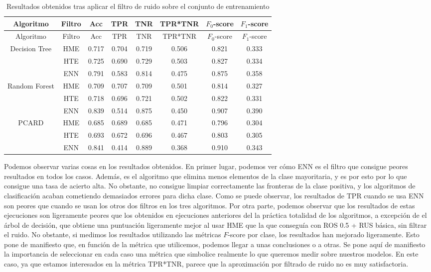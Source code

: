 \documentclass[
  a4paper,
,tablecaptionabove
]{scrartcl}
\begin{document}
\begin{longtable}[]{@{}cccccccc@{}}
\caption{Resultados obtenidos tras aplicar el filtro de ruido sobre el
conjunto de entrenamiento}\tabularnewline
\toprule
Algoritmo & Filtro & Acc & TPR & TNR & TPR*TNR & \(F_0\)-score &
\(F_1\)-score\tabularnewline
\midrule
\endfirsthead
\toprule
Algoritmo & Filtro & Acc & TPR & TNR & TPR*TNR & \(F_0\)-score &
\(F_1\)-score\tabularnewline
\midrule
\endhead
Decision Tree & HME & 0.717 & 0.704 & 0.719 & 0.506 & 0.821 &
0.333\tabularnewline
& HTE & 0.725 & 0.690 & 0.729 & 0.503 & 0.827 & 0.334\tabularnewline
& ENN & 0.791 & 0.583 & 0.814 & 0.475 & 0.875 & 0.358\tabularnewline
\midrule
Random Forest & HME & 0.709 & 0.707 & 0.709 & 0.501 & 0.814 &
0.327\tabularnewline
& HTE & 0.718 & 0.696 & 0.721 & 0.502 & 0.822 & 0.331\tabularnewline
& ENN & 0.839 & 0.514 & 0.875 & 0.450 & 0.907 & 0.390\tabularnewline
\midrule
PCARD & HME & 0.685 & 0.689 & 0.685 & 0.471 & 0.796 &
0.304\tabularnewline
& HTE & 0.693 & 0.672 & 0.696 & 0.467 & 0.803 & 0.305\tabularnewline
& ENN & 0.841 & 0.414 & 0.889 & 0.368 & 0.910 & 0.343\tabularnewline
\bottomrule
\end{longtable}

Podemos observar varias cosas en los resultados obtenidos. En primer
lugar, podemos ver cómo ENN es el filtro que consigue peores resultados
en todos los casos. Además, es el algoritmo que elimina menos elementos
de la clase mayoritaria, y es por esto por lo que consigue una tasa de
acierto alta. No obstante, no consigue limpiar correctamente las
fronteras de la clase positiva, y los algoritmos de clasificación acaban
cometiendo demasiados errores para dicha clase. Como se puede observar,
los resultados de TPR cuando se usa ENN son peores que cuando se usan
los otros dos filtros en los tres algoritmos. Por otra parte, podemos
observar que los resultados de estas ejecuciones son ligeramente peores
que los obtenidos en ejecuciones anteriores del la práctica totalidad de
los algoritmos, a excepción de el árbol de decisión, que obtiene una
puntuación ligeramente mejor al usar HME que la que conseguía con ROS
0.5 + RUS básica, sin filtrar el ruido. No obstante, si medimos los
resultados utilizando las métricas \(F\)-score por clase, los resultados
han mejorado ligeramente. Esto pone de manifiesto que, en función de la
métrica que utilicemos, podemos llegar a unas conclusiones o a otras. Se
pone aquí de manifiesto la importancia de seleccionar en cada caso una
métrica que simbolice realmente lo que queremos medir sobre nuestros
modelos. En este caso, ya que estamos interesados en la métrica TPR*TNR,
parece que la aproximación por filtrado de ruido no es muy
satisfactoria.
\end{document}
